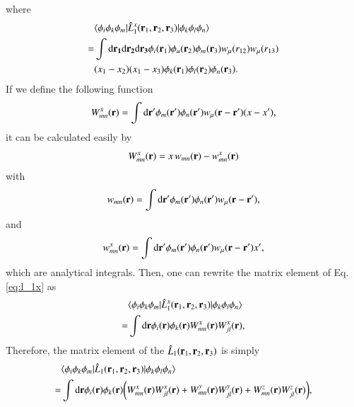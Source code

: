 \documentclass[aip,jcp,reprint,noshowkeys,superscriptaddress]{revtex4-1}
\newcommand{\matelem}[3]{\langle #1 | #2 | #3 \rangle}
\newcommand{\bri}[1]{{\bf r}_{#1}}
\newcommand{\dr}[1]{\text{d}{\bf r_{#1}}}
\begin{document}
where 
\begin{equation}
 \begin{aligned}
 \label{eq:l_1x}
& \matelem{\phi_i \phi_k \phi_m}{\hat{L}_1^x(\bri{1},\bri{2},\bri{3})}{\phi_k \phi_l \phi_n} \\  
 = & \int \dr{1} \dr{2} \dr{3} \phi_i(\bri{1}) \phi_u(\bri{2}) \phi_m(\bri{3}) w_{\mu}(r_{12}) w_{\mu}(r_{13}) \\ 
 &(x_1 - x_2) (x_1 - x_3) \phi_k(\bri{1}) \phi_l(\bri{2}) \phi_n(\bri{3}).
 \end{aligned}
\end{equation}
If we define the following function 
\begin{equation}
 W_{mn}^x({\bf r})  = \int \text{d}{\bf r'} \phi_m({\bf r}') \phi_n({\bf r}') w_{\mu}({\bf r} - {\bf r'}) (x - x'),  
\end{equation}
it can be calculated easily by
\begin{equation}
 W_{mn}^x({\bf r})  = x \, w_{mn}({\bf r}) - w_{mn}^x({\bf r})
\end{equation}
with 
\begin{equation}
 w_{mn}({\bf r}) = \int \text{d}{\bf r'} \phi_m({\bf r}') \phi_n({\bf r}') w_{\mu}({\bf r} - {\bf r'}), 
\end{equation}
and 
\begin{equation}
  w_{mn}^x({\bf r}) = \int \text{d}{\bf r'} \phi_m({\bf r}') \phi_n({\bf r}') w_{\mu}({\bf r} - {\bf r'})  x',
\end{equation}
which are analytical integrals.  
Then, one can rewrite the matrix element of Eq. \eqref{eq:l_1x} as
\begin{equation}
 \begin{aligned}
 \label{eq:l_1x_2}
& \matelem{\phi_i \phi_k \phi_m}{\hat{L}_1^x(\bri{1},\bri{2},\bri{3})}{\phi_k \phi_l \phi_n} \\  
 = & \int \text{d}{\bf r} \phi_i({\bf r})  \phi_k({\bf r}) W_{mn}^x({\bf r}) W_{jl}^x({\bf r}),
 \end{aligned}
\end{equation}
Therefore, the matrix element of the $\hat{L}_1(\bri{1},\bri{2},\bri{3})$ is simply 
\begin{equation}
 \begin{aligned}
 & \matelem{\phi_i \phi_k \phi_m}{\hat{L}_1(\bri{1},\bri{2},\bri{3})}{\phi_k \phi_l \phi_n} \\
 = & \int \text{d}{\bf r} \phi_i({\bf r})  \phi_k({\bf r}) \bigg( W_{mn}^x({\bf r}) W_{jl}^x({\bf r}) + W_{mn}^y({\bf r}) W_{jl}^y({\bf r}) + W_{mn}^z({\bf r}) W_{jl}^z({\bf r})\bigg),
 \end{aligned}
\end{equation}
\end{document}
